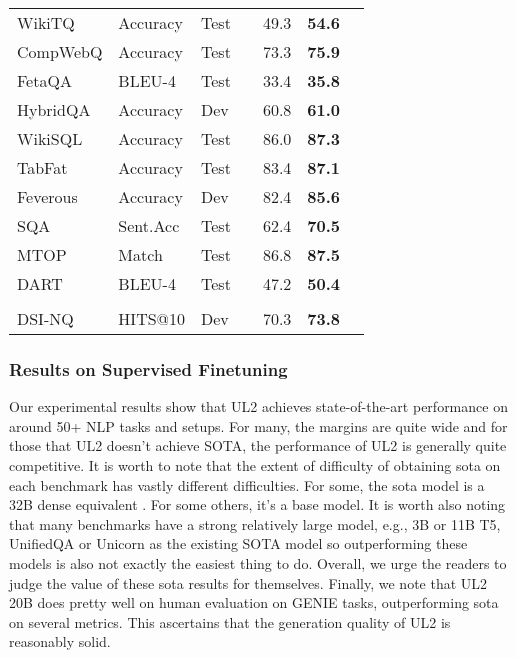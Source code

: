 \documentclass[10pt]{article}
\begin{document}
\begin{center}
\begin{longtable}{lllllll}
    WikiTQ & Accuracy & Test & \citeauthor{xie2022unifiedskg}  & 49.3 & \textbf{54.6} \\
    CompWebQ & Accuracy & Test &  \citeauthor{xie2022unifiedskg}  & 73.3 & \textbf{75.9} \\
    FetaQA & BLEU-4 & Test & \citeauthor{xie2022unifiedskg}  & 33.4 & \textbf{35.8} \\ 
    HybridQA & Accuracy & Dev & \citeauthor{eisenschlos2021mate}  & 60.8 & \textbf{61.0}\\
    WikiSQL & Accuracy & Test & \citeauthor{xie2022unifiedskg}  & 86.0 & \textbf{87.3} \\
    TabFat & Accuracy & Test & \citeauthor{xie2022unifiedskg}  & 83.4 & \textbf{87.1} \\
    Feverous & Accuracy & Dev & \citeauthor{xie2022unifiedskg}  & 82.4 & \textbf{85.6} \\
    SQA & Sent.Acc & Test & \citeauthor{xie2022unifiedskg}  & 62.4 & \textbf{70.5}\\
    MTOP & Match & Test & \citeauthor{xie2022unifiedskg}  & 86.8 & \textbf{87.5} \\
    DART & BLEU-4 & Test & \citeauthor{aghajanyan2021htlm}  & 47.2 &  \textbf{50.4} \\
    \\
    DSI-NQ & HITS@10 & Dev &\citeauthor{tay2022transformer}  & 70.3 & \textbf{73.8} \\ 
    \bottomrule
\end{longtable}
\end{center}
\normalsize



\subsubsection{Results on Supervised Finetuning} Our experimental results show that UL2 achieves state-of-the-art performance on around 50+ NLP tasks and setups. For many, the margins are quite wide and for those that UL2 doesn't achieve SOTA, the performance of UL2 is generally quite competitive. It is worth to note that the extent of difficulty of obtaining sota on each benchmark has vastly different difficulties. For some, the sota model is a 32B dense equivalent \citep{zoph2022designing}. For some others, it's a base model. It is worth also noting that many benchmarks have a strong relatively large model, e.g., 3B or 11B T5, UnifiedQA \citep{khashabi2020unifiedqa} or Unicorn \citep{lourie2021unicorn} as the existing SOTA model so outperforming these models is also not exactly the easiest thing to do. Overall, we urge the readers to judge the value of these sota results for themselves. Finally, we note that UL2 20B does pretty well on human evaluation on GENIE tasks, outperforming sota on several metrics. This ascertains that the generation quality of UL2 is reasonably solid.
\end{document}

